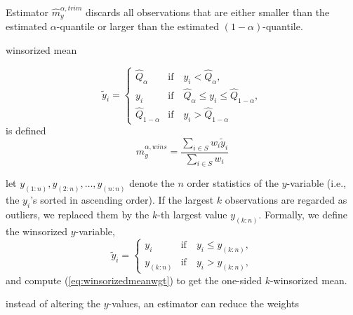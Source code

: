 \documentclass[a4paper,11pt]{scrreprt}
\theoremstyle{remark}
\begin{document}
Estimator $\widehat{m}_y^{\alpha, trim}$ discards all observations that are either smaller than the estimated $\alpha$-quantile or larger than the estimated $(1-\alpha)$-quantile. 

winsorized mean

\begin{equation*}
   \tilde{y}_i = \begin{cases} 
      \widehat{Q}_{\alpha} & \text{if} \quad y_i < \widehat{Q}_{\alpha}, \\
      y_i & \text{if} \quad \widehat{Q}_{\alpha} \leq y_i \leq \widehat{Q}_{1-\alpha}, \\
      \widehat{Q}_{1-\alpha} & \text{if} \quad y_i > \widehat{Q}_{1-\alpha}
   \end{cases}
\end{equation*}
\noindent is defined 
\begin{equation}\label{eq:winsorizedmeanwgt}
   \widehat{m}_y^{\alpha, wins} = \frac{\sum_{i \in S}w_i \tilde{y}_i}{\sum_{i \in S} w_i} 
\end{equation}

 let $y_{(1:n)}, y_{(2:n)}, \ldots, y_{(n:n)}$ denote the $n$ order statistics of the $y$-variable (i.e., the $y_i$'s sorted in ascending order). If the largest $k$ observations are regarded as outliers, we replaced them by the $k$-th largest value $y_{(k:n)}$. Formally, we define the winsorized $y$-variable, 
\begin{equation*}
   \tilde{y}_i = \begin{cases} 
      y_i & \text{if} \quad  y_i \leq y_{(k:n)}, \\
      y_{(k:n)} & \text{if} \quad y_i > y_{(k:n)},
   \end{cases}
\end{equation*}
\noindent and compute (\ref{eq:winsorizedmeanwgt}) to get the one-sided $k$-winsorized mean.


instead of altering the $y$-values, an estimator can reduce the weights 

\end{document}
